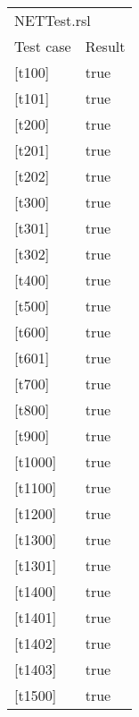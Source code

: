 \documentclass[a4]{article}
\begin{document}
\begin{table}[h]
    \begin{tabular}{ll}
        \multicolumn{2}{l}{NETTest.rsl}          \\
        \multicolumn{1}{l|}{Test case}  & Result \\ \hline 
        \multicolumn{1}{l|}{{[}t100{]}} & true   \\
        \multicolumn{1}{l|}{{[}t101{]}} & true   \\
        \multicolumn{1}{l|}{{[}t200{]}} & true   \\
        \multicolumn{1}{l|}{{[}t201{]}} & true   \\
        \multicolumn{1}{l|}{{[}t202{]}} & true   \\
        \multicolumn{1}{l|}{{[}t300{]}} & true   \\
        \multicolumn{1}{l|}{{[}t301{]}} & true   \\
        \multicolumn{1}{l|}{{[}t302{]}} & true   \\
        \multicolumn{1}{l|}{{[}t400{]}} & true   \\
        \multicolumn{1}{l|}{{[}t500{]}} & true   \\
        \multicolumn{1}{l|}{{[}t600{]}} & true   \\
        \multicolumn{1}{l|}{{[}t601{]}} & true   \\
        \multicolumn{1}{l|}{{[}t700{]}} & true   \\
        \multicolumn{1}{l|}{{[}t800{]}} & true   \\
        \multicolumn{1}{l|}{{[}t900{]}} & true   \\
        \multicolumn{1}{l|}{{[}t1000{]}} & true  \\
        \multicolumn{1}{l|}{{[}t1100{]}} & true  \\
        \multicolumn{1}{l|}{{[}t1200{]}} & true  \\
        \multicolumn{1}{l|}{{[}t1300{]}} & true  \\
        \multicolumn{1}{l|}{{[}t1301{]}} & true  \\
        \multicolumn{1}{l|}{{[}t1400{]}} & true  \\
        \multicolumn{1}{l|}{{[}t1401{]}} & true  \\
        \multicolumn{1}{l|}{{[}t1402{]}} & true  \\
        \multicolumn{1}{l|}{{[}t1403{]}} & true  \\
        \multicolumn{1}{l|}{{[}t1500{]}} & true  \\

\end{tabular}
\end{table}
\end{document}
